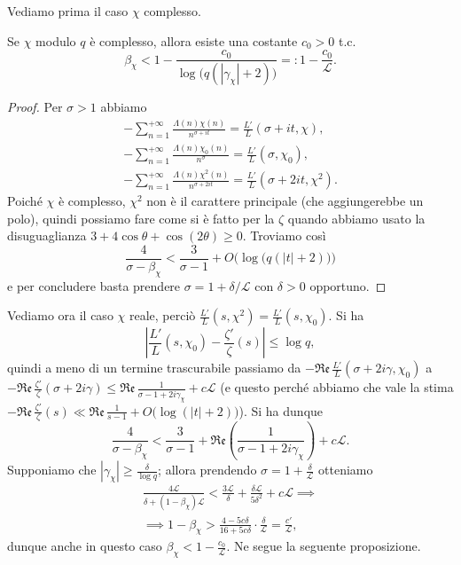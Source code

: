 Vediamo prima il caso $\chi$ complesso.

\begin{prop}
  Se $\chi$ modulo $q$ è complesso, allora esiste una costante $c_0>0$ t.c.
  $$\beta_\chi < 1-\frac{c_0}{\log\big(q(|\gamma_\chi|+2)\big)}=:1-\frac{c_0}{\mathcal{L}}.$$
\end{prop}

\begin{proof}
  Per $\sigma>1$ abbiamo
  \begin{gather*}
    -\sum_{n=1}^{+\infty} \frac{\Lambda(n)\chi(n)}{n^{\sigma+it}}=\frac{L'}{L}(\sigma+it,\chi), \\
    -\sum_{n=1}^{+\infty} \frac{\Lambda(n)\chi_0(n)}{n^{\sigma}}=\frac{L'}{L}(\sigma,\chi_0), \\
    -\sum_{n=1}^{+\infty} \frac{\Lambda(n)\chi^2(n)}{n^{\sigma+2it}}=\frac{L'}{L}(\sigma+2it,\chi^2).
  \end{gather*}
  Poiché $\chi$ è complesso, $\chi^2$ non è il carattere principale (che aggiungerebbe un polo), quindi possiamo fare come si è fatto per la $\zeta$ quando abbiamo usato la disuguaglianza $3+4\cos{\theta}+\cos(2\theta) \ge 0$. Troviamo così
  $$\frac{4}{\sigma-\beta_\chi}<\frac{3}{\sigma-1}+O\Big(\log\big(q(|t|+2)\big)\Big)$$
  e per concludere basta prendere $\sigma=1+\delta/\mathcal{L}$ con $\delta>0$ opportuno.
\end{proof}

Vediamo ora il caso $\chi$ reale, perciò $\frac{L'}{L}(s,\chi^2)=\frac{L'}{L}(s,\chi_0)$. Si ha
$$\left|\frac{L'}{L}(s,\chi_0)-\frac{\zeta'}{\zeta}(s)\right| \le \log{q},$$
quindi a meno di un termine trascurabile passiamo da $-\mathfrak{Re}\,\frac{L'}{L}(\sigma+2i\gamma,\chi_0)$ a $-\mathfrak{Re}\,\frac{\zeta'}{\zeta}(\sigma+2i\gamma) \le \mathfrak{Re}\,\frac{1}{\sigma-1+2i\gamma_\chi}+c\mathcal{L}$ (e questo perché abbiamo che vale la stima $-\mathfrak{Re}\,\frac{\zeta'}{\zeta}(s) \ll \mathfrak{Re}\,\frac{1}{s-1}+O\big(\log(|t|+2)\big)$). Si ha dunque
$$\frac{4}{\sigma-\beta_\chi}<\frac{3}{\sigma-1}+\mathfrak{Re}\left(\frac{1}{\sigma-1+2i\gamma_\chi}\right)+c\mathcal{L}.$$
Supponiamo che $|\gamma_\chi| \ge \frac{\delta}{\log{q}}$; allora prendendo $\sigma=1+\frac{\delta}{\mathcal{L}}$ otteniamo
\begin{gather*}
  \frac{4\mathcal{L}}{\delta+(1-\beta_\chi)\mathcal{L}}<\frac{3 \mathcal{L}}{\delta}+\frac{\delta\mathcal{L}}{5\delta^2}+c\mathcal{L} \implies \\
  \implies 1-\beta_\chi>\frac{4-5c\delta}{16+5c\delta}\cdot\frac{\delta}{\mathcal{L}}=\frac{c'}{\mathcal{L}},
\end{gather*}
dunque anche in questo caso $\beta_\chi<1-\frac{c_0}{\mathcal{L}}$. Ne segue la seguente proposizione.

